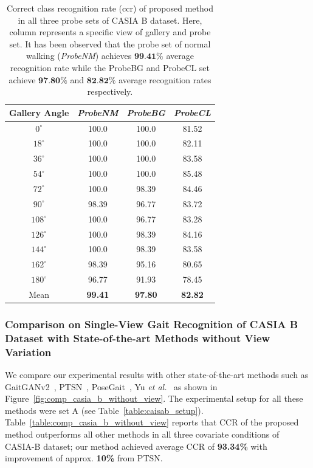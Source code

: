 \begin{table}[t]
	\centering
	\caption{Correct class recognition rate (\gls{ccr}) of proposed method in all three probe sets of CASIA B dataset. Here, column represents a specific view of gallery and probe set.  It has been observed that the probe set of normal walking (\textit{ProbeNM}) achieves $ \textbf{99.41\%}$ average recognition rate while the ProbeBG and ProbeCL set achieve $ \textbf{97.80\%}$ and $\textbf{82.82\%}$ average recognition rates respectively. \label{table:resutl_without_view}}
	{\begin{tabular*}{22pc}{cccc}\hline
	Gallery Angle  &\textit{ProbeNM}  &\textit{ProbeBG} &\textit{ProbeCL} \\\hline\noalign{\smallskip} 
	${0^{\circ}}$	&100.0  &100.0  &81.52  \\\noalign{\smallskip}
	${18^{\circ}}$  &100.0  &100.0  &82.11  \\\noalign{\smallskip}
	${36^{\circ}}$	&100.0  &100.0  &83.58  \\\noalign{\smallskip}
	${54^{\circ}}$	&100.0  &100.0  &85.48  \\\noalign{\smallskip}
	${72^{\circ}}$	&100.0  &98.39 &84.46   \\\noalign{\smallskip}
	${90^{\circ}}$	&98.39  &96.77  &83.72  \\\noalign{\smallskip} 
	${108^{\circ}}$ &100.0  &96.77  &83.28  \\\noalign{\smallskip}
	${126^{\circ}}$ &100.0  &98.39  &84.16  \\\noalign{\smallskip}
	${144^{\circ}}$ &100.0  &98.39  &83.58  \\\noalign{\smallskip}
	${162^{\circ}}$	&98.39  &95.16  &80.65 \\\noalign{\smallskip}
	${180^{\circ}}$ &96.77  &91.93  &78.45  \\\noalign{\smallskip}
	Mean &\textbf{99.41}  &\textbf{97.80}  &\textbf{82.82} \\\hline
	\end{tabular*}}{}
\end{table}



\subsubsection{Comparison on Single-View Gait Recognition of CASIA B Dataset with State-of-the-art Methods without View Variation}
We compare our experimental results with other state-of-the-art methods such as GaitGANv2~\cite{Yu_19}, PTSN~\cite{Liao_17}, PoseGait~\cite{Liao_19}, Yu \textit{et al.}~\cite{Yu_17_spae} as shown in Figure~\ref{fig:comp_casia_b_without_view}. The experimental setup for all these methods were set A (see Table~\ref{table:caisab_setup}). Table~\ref{table:comp_casia_b_without_view} reports that CCR of the proposed method outperforms all other methods in all three covariate conditions of CASIA-B dataset; our method achieved average CCR of \textbf{93.34\%} with improvement of approx. \textbf{10\%} from PTSN.


